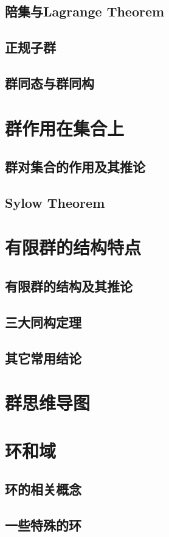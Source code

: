 \documentclass[zihao=-4,UTF8]{report}
\begin{document}
\subsection{陪集与Lagrange Theorem}
\subsection{正规子群}
\subsection{群同态与群同构}

\section{群作用在集合上}
\subsection{群对集合的作用及其推论}
\subsection{Sylow Theorem}

\section{有限群的结构特点}
\subsection{有限群的结构及其推论}
\subsection{三大同构定理}
\subsection{其它常用结论}

\section{群思维导图}

\section{环和域}
\subsection{环的相关概念}
\subsection{一些特殊的环}
\end{document}

